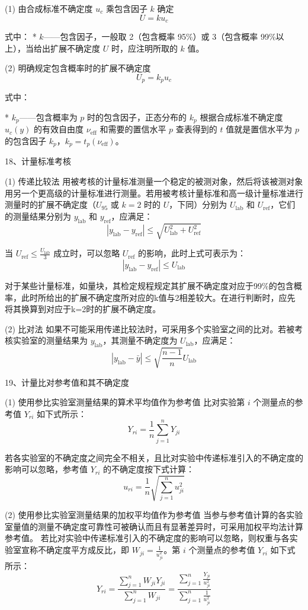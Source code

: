 \documentclass[UTF8]{ctexart}
\begin{document}
(1) 由合成标准不确定度 \(u_c\) 乘包含因子 \(k\) 确定
\[
U = k u_c
\]

式中：
*   \(k\)——包含因子，一般取 2（包含概率 95\%）或 3（包含概率 99\%以上），当给出扩展不确定度 \(U\) 时，应注明所取的 \(k\) 值。

(2) 明确规定包含概率时的扩展不确定度
\[
U_p = k_p u_c
\]

式中：

*   \(k_p\)——包含概率为 \(p\) 时的包含因子，正态分布的 \(k_p\) 根据合成标准不确定度 \(u_c(y)\) 的有效自由度 \(\nu_{\text{eff}}\) 和需要的置信水平 \(p\) 查表得到的 \(t\) 值就是置信水平为 \(p\) 的包含因子 \(k_p\)，\(k_p = t_p(\nu_{\text{eff}})\)。

\vspace{5mm} 
18、计量标准考核

(1) 传递比较法
用被考核的计量标准测量一个稳定的被测对象，然后将该被测对象用另一个更高级的计量标准进行测量。若用被考核计量标准和高一级计量标准进行测量时的扩展不确定度（\(U_{95}\) 或 \(k=2\) 时的 \(U\)，下同）分别为 \(U_{\text{lab}}\) 和 \(U_{\text{ref}}\)，它们的测量结果分别为 \(y_{\text{lab}}\) 和 \(y_{\text{ref}}\)，应满足：
\[
|y_{\text{lab}} - y_{\text{ref}}| \le \sqrt{U_{\text{lab}}^2 + U_{\text{ref}}^2}
\]

当 \(U_{\text{ref}} \le \frac{U_{\text{lab}}}{3}\) 成立时，可以忽略 \(U_{\text{ref}}\) 的影响，此时上式可表示为：
\[
|y_{\text{lab}} - y_{\text{ref}}| \le U_{\text{lab}}
\]

对于某些计量标准，如量块，其检定规程规定其扩展不确定度对应于99\%的包含概率，此时所给出的扩展不确定度所对应的k值与2相差较大。在进行判断时，应先将其换算到对应于k=2时的扩展不确定度。

(2) 比对法
如果不可能采用传递比较法时，可采用多个实验室之间的比对。若被考核实验室的测量结果为 \(y_{\text{lab}}\)，其测量不确定度为 \(U_{\text{lab}}\)，应满足：
\[
|y_{\text{lab}} - \bar{y}| \le \sqrt{\frac{n-1}{n}} U_{\text{lab}}
\]

\vspace{5mm} 
19、计量比对参考值和其不确定度

(1) 使用参比实验室测量结果的算术平均值作为参考值
比对实验第 \(i\) 个测量点的参考值 \(Y_{ri}\) 如下式所示：
\[
Y_{ri} = \frac{1}{n} \sum_{j=1}^{n} Y_{ji}
\]

若各实验室的不确定度之间完全不相关，且比对实验中传递标准引入的不确定度的影响可以忽略，参考值 \(Y_{ri}\) 的不确定度按下式计算：
\[
u_{ri} = \frac{1}{n} \sqrt{\sum_{j=1}^{n} u_{ji}^2}
\]

(2) 使用参比实验室测量结果的加权平均值作为参考值
当参与参考值计算的各实验室量值的测量不确定度可靠性可被确认而且有显著差异时，可采用加权平均法计算参考值。
若比对实验中传递标准引入的不确定度的影响可以忽略，则权重与各实验室宣称不确定度平方成反比，即 \(W_{ji} = \frac{1}{u_{ji}^2}\)。第 \(i\) 个测量点的参考值 \(Y_{ri}\) 如下式所示：
\[
Y_{ri} = \frac{\sum_{j=1}^{n} W_{ji} Y_{ji}}{\sum_{j=1}^{n} W_{ji}} = \frac{\sum_{j=1}^{n} \frac{Y_{ji}}{u_{ji}^2}}{\sum_{j=1}^{n} \frac{1}{u_{ji}^2}}
\]
\end{document}
